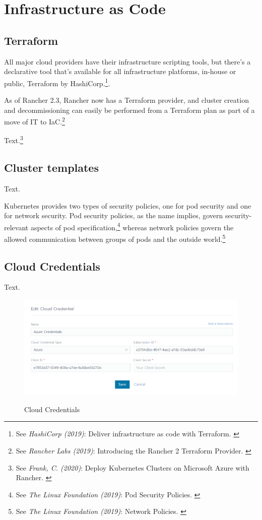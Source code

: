 %
%

\pagebreak
\section{Infrastructure as Code}

\onehalfspacing

\subsection{Terraform}

All major cloud providers have their infrastructure scripting tools, but there's a declarative tool that's available for all infrastructure platforms, in-house or public, Terraform by HashiCorp.\footnote{See \textit{HashiCorp (2019)}: Deliver infrastructure as code with Terraform. \cite{terraform}}.

As of Rancher 2.3, Rancher now has a Terraform provider, and cluster creation and decommissioning can easily be performed from a Terraform plan as part of a move of IT to IaC.\footnote{See \textit{Rancher Labs (2019)}: Introducing the Rancher 2 Terraform Provider. \cite{terraformProvider}}

Text.\footnote{See \textit{Frank, C. (2020)}: Deploy Kubernetes Clusters on Microsoft Azure with Rancher. \cite{deployAzure}}

\subsection{Cluster templates}

Text.

Kubernetes provides two types of security policies, one for pod security and one for network security. Pod security policies, as the name implies, govern security-relevant aspects of pod specification,\footnote{See \textit{The Linux Foundation (2019)}: Pod Security Policies. \cite{podSecurity}} whereas network policies govern the allowed communication between groups of pods and the outside world.\footnote{See \textit{The Linux Foundation (2019)}: Network Policies. \cite{netSecurity}}

\subsection{Cloud Credentials}

Text.

\begin{figure}[H]
\centering
\caption {Cloud Credentials}
\includegraphics[width=\linewidth]{images/cloud-credentials.png}
\label{fig:cloudCredentials}
\end{figure}

